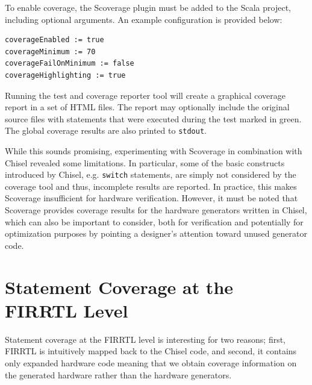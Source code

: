 \documentclass[conference]{IEEEtran}
\begin{document}
To enable coverage, the Scoverage plugin must be added to the Scala project, including optional arguments.
An example configuration is provided below:
\begin{verbatim}
coverageEnabled := true
coverageMinimum := 70
coverageFailOnMinimum := false
coverageHighlighting := true
\end{verbatim}
Running the test and coverage reporter tool will create a graphical coverage report in a set of HTML files. The report may optionally include the original source files with statements that were executed during the test marked in green. The global coverage results are also printed to \texttt{stdout}.

While this sounds promising, experimenting with Scoverage in combination with Chisel revealed some limitations. In particular, some of the basic constructs introduced by Chisel, e.g. \texttt{switch} statements, are simply not considered by the coverage tool and thus, incomplete results are reported. In practice, this makes Scoverage insufficient for hardware verification. However, it must be noted that Scoverage provides coverage results for the hardware generators written in Chisel, which can also be important to consider, both for verification and potentially for optimization purposes by pointing a designer's attention toward unused generator code.

\section{Statement Coverage at the FIRRTL Level}  
Statement coverage at the FIRRTL level is interesting for two reasons; first, FIRRTL is intuitively mapped back to the Chisel code, and second, it contains only expanded hardware code meaning that we obtain coverage information on the generated hardware rather than the hardware generators.%
\end{document}
